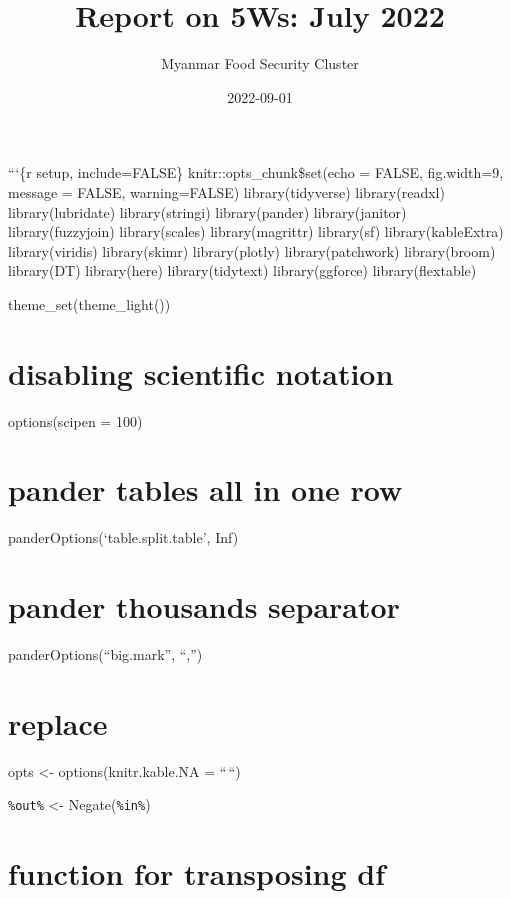 \documentclass[
]{article}
\title{\textbf{Report on 5Ws: July 2022}}
\author{Myanmar Food Security Cluster}
\date{2022-09-01}
\begin{document}
\maketitle

{
\hypersetup{linkcolor=}
\setcounter{tocdepth}{4}
\tableofcontents
}
```\{r setup, include=FALSE\} knitr::opts\_chunk\$set(echo = FALSE,
fig.width=9, message = FALSE, warning=FALSE) library(tidyverse)
library(readxl) library(lubridate) library(stringi) library(pander)
library(janitor) library(fuzzyjoin) library(scales) library(magrittr)
library(sf) library(kableExtra) library(viridis) library(skimr)
library(plotly) library(patchwork) library(broom) library(DT)
library(here) library(tidytext) library(ggforce) library(flextable)

theme\_set(theme\_light())

\hypertarget{disabling-scientific-notation}{%
\section{disabling scientific
notation}\label{disabling-scientific-notation}}

options(scipen = 100)

\hypertarget{pander-tables-all-in-one-row}{%
\section{pander tables all in one
row}\label{pander-tables-all-in-one-row}}

panderOptions(`table.split.table', Inf)

\hypertarget{pander-thousands-separator}{%
\section{pander thousands separator}\label{pander-thousands-separator}}

panderOptions(``big.mark'', ``,'')

\hypertarget{replace}{%
\section{replace}\label{replace}}

opts \textless- options(knitr.kable.NA = ``\,``)

\texttt{\%out\%} \textless- Negate(\texttt{\%in\%})

\hypertarget{function-for-transposing-df}{%
\section{function for transposing
df}\label{function-for-transposing-df}}
\end{document}
